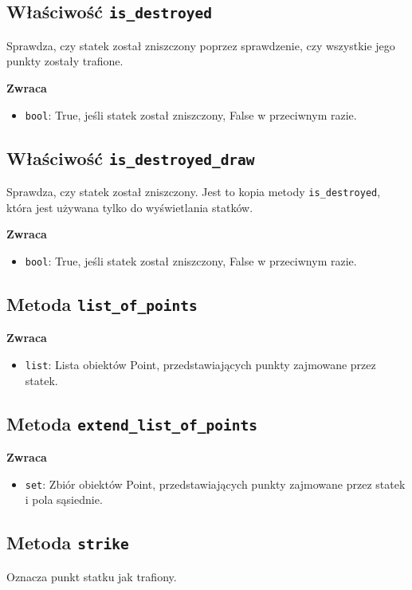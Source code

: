 \documentclass[12pt]{article}
\begin{document}
    \subsection{Właściwość \texttt{is\_destroyed}}
            Sprawdza, czy statek został zniszczony poprzez sprawdzenie, czy wszystkie jego punkty zostały trafione.

        \textbf{Zwraca}
        \begin{itemize}
            \item \texttt{bool}: True, jeśli statek został zniszczony, False w przeciwnym razie.
        \end{itemize}
        

    \subsection{Właściwość \texttt{is\_destroyed\_draw}}
        Sprawdza, czy statek został zniszczony.
        Jest to kopia metody \texttt{is\_destroyed}, która jest używana tylko do wyświetlania statków.

        \textbf{Zwraca}
        \begin{itemize}
            \item \texttt{bool}: True, jeśli statek został zniszczony, False w przeciwnym razie.
        \end{itemize}

    \subsection{Metoda \texttt{list\_of\_points}}
        \textbf{Zwraca}
        \begin{itemize}
            \item \texttt{list}: Lista obiektów Point, przedstawiających punkty zajmowane przez statek.
        \end{itemize}

    \subsection{Metoda \texttt{extend\_list\_of\_points}}
        \textbf{Zwraca}
        \begin{itemize}
            \item \texttt{set}: Zbiór obiektów Point, przedstawiających punkty zajmowane przez statek i pola sąsiednie.
        \end{itemize}

    \subsection{Metoda \texttt{strike}}
        Oznacza punkt statku jak trafiony.
\end{document}
